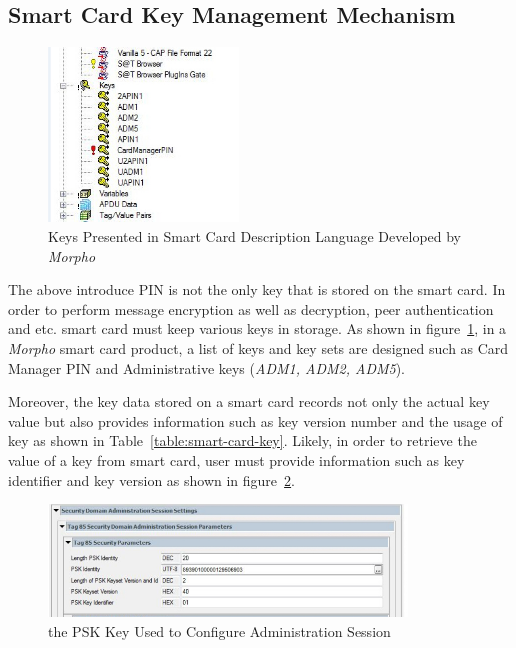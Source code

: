 \subsection{Smart Card Key Management Mechanism} \label{labelKeyManagement}

 \begin{figure}[!htb]
	\centering
	\includegraphics[width=0.45\textwidth]{smart-card-key.jpg}
		\caption{Keys Presented in Smart Card Description Language Developed by \emph{Morpho}}
	\label{fig:smart-card-key}
\end{figure}

The above introduce PIN is not the only key that is stored on the smart card. In order to perform message encryption as well as decryption, peer authentication and etc. smart card must keep various keys in storage. As shown in figure~\ref{fig:smart-card-key}, in a \emph{Morpho} smart card product, a list of keys and key sets are designed such as Card Manager PIN and Administrative keys (\emph{ADM1, ADM2, ADM5}).

Moreover, the key data stored on a  smart card records not only the actual key value but also provides information such as key version number and the usage of key as shown in Table~\ref{table:smart-card-key}. Likely, in order to retrieve the value of a key from smart card, user must provide information such as key identifier and key version as shown in figure~\ref{fig:smart-card-key-use}.

 \begin{figure}[!htb]
	\centering
	\includegraphics[width=0.85\textwidth]{smart-card-key-use.jpg}
		\caption{the PSK Key Used to Configure Administration Session}
	\label{fig:smart-card-key-use}
\end{figure}

